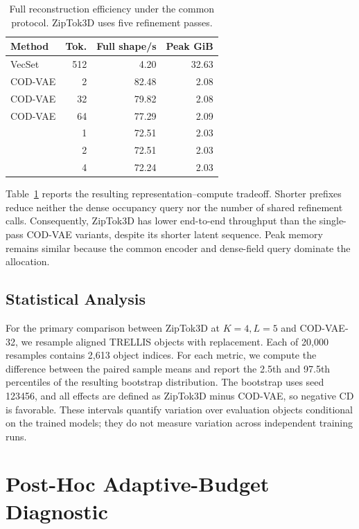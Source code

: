 \begin{table}[t]
\centering
\small
\setlength{\tabcolsep}{4pt}
\begin{tabular}{lrrr}
\toprule
Method & Tok. & Full shape/s & Peak GiB \\
\midrule
VecSet & 512 & 4.20 & 32.63 \\
COD-VAE & 2 & 82.48 & 2.08 \\
COD-VAE & 32 & 79.82 & 2.08 \\
COD-VAE & 64 & 77.29 & 2.09 \\
\midrule
\ours{} & 1 & 72.51 & 2.03 \\
\ours{} & 2 & 72.51 & 2.03 \\
\ours{} & 4 & 72.24 & 2.03 \\
\bottomrule
\end{tabular}
\caption{Full reconstruction efficiency under the common protocol.  ZipTok3D
uses five refinement passes.}
\label{tab:supp-reconstruction-efficiency}
\end{table}

Table~\ref{tab:supp-reconstruction-efficiency} reports the resulting
representation--compute tradeoff. Shorter prefixes reduce neither the dense
occupancy query nor the number of shared refinement calls. Consequently,
ZipTok3D has lower end-to-end throughput than the single-pass COD-VAE variants,
despite its shorter latent sequence. Peak memory remains similar because the
common encoder and dense-field query dominate the allocation.

\subsection{Statistical Analysis}

For the primary comparison between ZipTok3D at $K=4,L=5$ and COD-VAE-32, we
resample aligned TRELLIS objects with replacement. Each of 20,000 resamples
contains 2,613 object indices. For each metric, we compute the difference
between the paired sample means and report the 2.5th and 97.5th percentiles of
the resulting bootstrap distribution. The bootstrap uses seed 123456, and all
effects are defined as ZipTok3D minus COD-VAE, so negative CD is favorable.
These intervals quantify variation over evaluation objects conditional on the
trained models; they do not measure variation across independent training
runs.


\section{Post-Hoc Adaptive-Budget Diagnostic}
\label{sec:posthoc-oracle}


